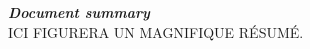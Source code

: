 \thispagestyle{empty}
\vspace*{10mm}

\textbf{\emph{\textcolor{onitu}{\large{Document summary} } } }\\

ICI FIGURERA UN MAGNIFIQUE RÉSUMÉ.

\clearpage
